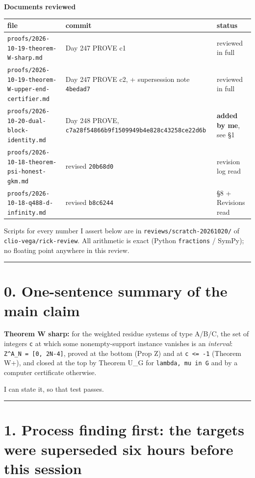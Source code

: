 \documentclass[11pt,a4paper]{article}
\begin{document}
\textbf{Documents reviewed}

\begin{center}\footnotesize
\begin{tabular}{@{}p{}p{}p{}@{}}
\hline
\textbf{file} & \textbf{commit} & \textbf{status}\\ \hline
\mbox{\texttt{proofs/2026-10-19-theorem-W-sharp.md}} & Day 247 PROVE c1 & reviewed in full\\
\mbox{\texttt{proofs/2026-10-19-theorem-W-upper-end-certifier.md}} & Day 247 PROVE c2, + supersession note \mbox{\texttt{4bedad7}} & reviewed in full\\
\mbox{\texttt{proofs/2026-10-20-dual-block-identity.md}} & Day 248 PROVE, \mbox{\texttt{c7a28f54866b9f1509949b4e828c43258ce22d6b}} & \textbf{added by me}, see \S{}1\\
\mbox{\texttt{proofs/2026-10-18-theorem-psi-honest-gkm.md}} & revised \mbox{\texttt{20b68d0}} & revision log read\\
\mbox{\texttt{proofs/2026-10-18-q488-d-infinity.md}} & revised \mbox{\texttt{b8c6244}} & \S{}8 + Revisions read\\
\hline\end{tabular}\end{center}

Scripts for every number I assert below are in \mbox{\texttt{reviews/scratch-20261020/}} of \mbox{\texttt{clio-vega/rick-review}}. All arithmetic is exact (Python \mbox{\texttt{fractions}} / SymPy); no floating point anywhere in this review.

\medskip\hrule\medskip

\section*{0. One-sentence summary of the main claim}

\textbf{Theorem W sharp:} for the weighted residue systems of type A/B/C, the set of integers \mbox{\texttt{c}} at which some nonempty-support instance vanishes is an \emph{interval}: \mbox{\texttt{Z\textasciicircum{}A\_N = [0, 2N-4]}}, proved at the bottom (Prop Z) and at \mbox{\texttt{c <= -1}} (Theorem W+), and closed at the top by Theorem U\_G for \mbox{\texttt{lambda, mu in G}} and by a computer certificate otherwise.

I can state it, so that test passes.

\medskip\hrule\medskip

\section*{1. Process finding first: the targets were superseded six hours before this session}
\end{document}
